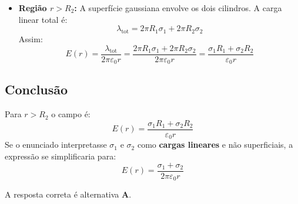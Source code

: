\begin{flushleft}
\begin{itemize}
    \item \textbf{Região $r > R_2$:}  
    A superfície gaussiana envolve os dois cilindros. A carga linear total é:
    \[
    \lambda_{\text{tot}} = 2\pi R_1 \sigma_1 + 2\pi R_2 \sigma_2
    \]
    Assim:
    \[
    E(r) = \frac{\lambda_{\text{tot}}}{2\pi \varepsilon_0 r} 
          = \frac{2\pi R_1 \sigma_1 + 2\pi R_2 \sigma_2}{2\pi \varepsilon_0 r}
          = \frac{\sigma_1 R_1 + \sigma_2 R_2}{\varepsilon_0 r}
    \]
\end{itemize}

\subsection*{Conclusão}
Para $r > R_2$ o campo é:
\[
E(r) = \frac{\sigma_1 R_1 + \sigma_2 R_2}{\varepsilon_0 r}
\]
Se o enunciado interpretasse $\sigma_1$ e $\sigma_2$ como \textbf{cargas lineares} e não superficiais, a expressão se simplificaria para:
\[
E(r) = \frac{\sigma_1 + \sigma_2}{2\pi \varepsilon_0 r}
\]


A resposta correta é alternativa \colorbox{green!50}{\textbf{A}}.
\end{flushleft}

